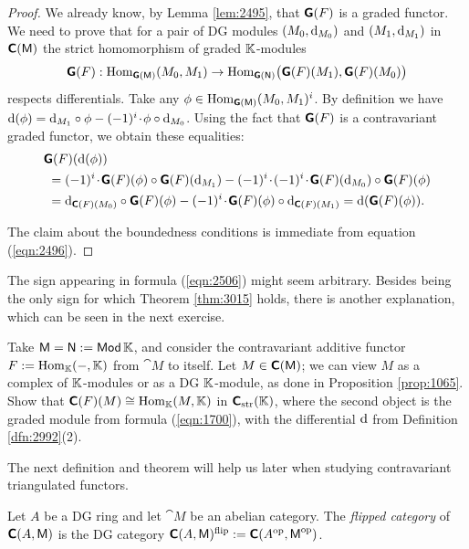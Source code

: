 \begin{proof}
We already know, by Lemma \ref{lem:2495}, that $\boldsymbol{\mathsf{G}}(F)$ is a graded 
functor. We need to prove that for a pair of DG modules 
$(M_0, \mathrm{d}_{M_0})$ and $(M_1, \mathrm{d}_{M_1})$ in $\boldsymbol{\mathsf{C}}(\operatorname{\mathsf{M}})$ 
the strict homomorphism of graded $\mathbb{K}$-modules 
\[ \boldsymbol{\mathsf{G}}(F) : \operatorname{Hom}_{\boldsymbol{\mathsf{G}}(\operatorname{\mathsf{M}})}(M_0, M_1) \to 
\operatorname{Hom}_{\boldsymbol{\mathsf{G}}(\operatorname{\mathsf{N}})} \bigl( \boldsymbol{\mathsf{G}}(F)(M_1), \boldsymbol{\mathsf{G}}(F)(M_0) \bigr) 
\]
respects differentials. Take any 
$\phi \in \operatorname{Hom}_{\boldsymbol{\mathsf{G}}(\operatorname{\mathsf{M}})}(M_0, M_1)^i$.
By definition we have 
$\mathrm{d}(\phi) = \mathrm{d}_{M_1} \circ \phi - (-1)^i \mspace{1.5mu}{\cdot}\mspace{1.5mu} \phi \circ \mathrm{d}_{M_0}$.
Using the fact that $\boldsymbol{\mathsf{G}}(F)$ is a contravariant graded functor, we obtain 
these equalities: 
\[ \begin{aligned}
& \boldsymbol{\mathsf{G}}(F)(\mathrm{d}(\phi)) 
\\
& \ = (-1)^{i} \mspace{1.5mu}{\cdot}\mspace{1.5mu} \boldsymbol{\mathsf{G}}(F)(\phi) \circ \boldsymbol{\mathsf{G}}(F)(\mathrm{d}_{M_1}) 
- (-1)^i \mspace{1.5mu}{\cdot}\mspace{1.5mu} (-1)^i \mspace{1.5mu}{\cdot}\mspace{1.5mu} \boldsymbol{\mathsf{G}}(F)(\mathrm{d}_{M_0}) \circ \boldsymbol{\mathsf{G}}(F)(\phi)
\\
& \ = \mathrm{d}_{\boldsymbol{\mathsf{C}}(F)(M_0)} \circ \boldsymbol{\mathsf{G}}(F)(\phi)
- (-1)^{i} \mspace{1.5mu}{\cdot}\mspace{1.5mu} \boldsymbol{\mathsf{G}}(F)(\phi) \circ \mathrm{d}_{\boldsymbol{\mathsf{C}}(F)(M_1)} 
= \mathrm{d}(\boldsymbol{\mathsf{G}}(F)(\phi)) . 
\end{aligned} \]

The claim about the boundedness conditions is immediate from equation 
(\ref{eqn:2496}). 
\end{proof}

The sign appearing in formula (\ref{eqn:2506}) might seem arbitrary. 
Besides being the only sign for which Theorem \ref{thm:3015} holds, 
there is another explanation, which can be seen in the next exercise. 

\begin{exer} \label{exer:2505}
Take $\operatorname{\mathsf{M}} = \operatorname{\mathsf{N}} := \operatorname{\mathsf{Mod}} \mathbb{K}$, and consider the contravariant 
additive functor $F := \operatorname{Hom}_{\mathbb{K}}(-, \mathbb{K})$ from $\cat{M}$ to itself.
Let $M \in \boldsymbol{\mathsf{C}}(\operatorname{\mathsf{M}})$; we can view $M$ as a complex of $\mathbb{K}$-modules or 
as a DG $\mathbb{K}$-module, as done in Proposition \ref{prop:1065}. 
Show that 
$\boldsymbol{\mathsf{C}}(F)(M) \cong \operatorname{Hom}_{\mathbb{K}}(M, \mathbb{K})$
in $\boldsymbol{\mathsf{C}}_{\mathrm{str}}(\mathbb{K})$, where the second object is the graded module 
from formula (\ref{eqn:1700}), with the differential 
$\mathrm{d}$ from Definition \ref{dfn:2992}(2). 
\end{exer}

The next definition and theorem will help us later when studying contravariant 
triangulated functors.

\begin{dfn} \label{dfn:3015}
Let $A$ be a DG ring and let $\cat{M}$ be an abelian 
category. The {\em flipped category}
of $\boldsymbol{\mathsf{C}}(A, \operatorname{\mathsf{M}})$ is the DG category 
$\boldsymbol{\mathsf{C}}(A, \operatorname{\mathsf{M}})^{\mathrm{flip}} := 
\boldsymbol{\mathsf{C}}(A^{\mathrm{op}}, \operatorname{\mathsf{M}}^{\mathrm{op}})$. 
\end{dfn}

